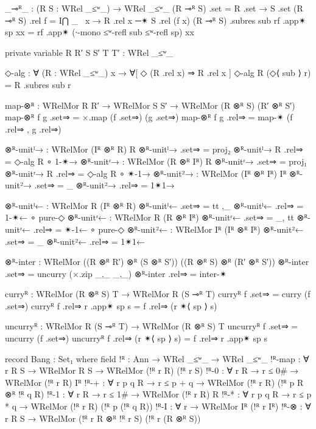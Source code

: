 \begin{code}
      _⊸ᴿ_ : (R S : WRel _≤ʷ_) → WRel _≤ʷ_
      (R ⊸ᴿ S) .set = R .set → S .set
      (R ⊸ᴿ S) .rel f = I⋂ _ \ x → R .rel x ─✴ S .rel (f x)
      (R ⊸ᴿ S) .subres sub rf .app✴ sp xx =
        rf .app✴ (∙-mono ≤ʷ-refl sub ≤ʷ-refl sp) xx

      private
        variable
          R R′ S S′ T T′ : WRel _≤ʷ_

      ◇-alg : ∀ (R : WRel _≤ʷ_) {x} → ∀[ ◇ (R .rel x) ⇒ R .rel x ]
      ◇-alg R (◇⟨ sub ⟩ r) = R .subres sub r

      map-⊗ᴿ : WRelMor R R′ → WRelMor S S′ → WRelMor (R ⊗ᴿ S) (R′ ⊗ᴿ S′)
      map-⊗ᴿ f g .set⇒ = ×.map (f .set⇒) (g .set⇒)
      map-⊗ᴿ f g .rel⇒ = map-✴ (f .rel⇒ , g .rel⇒)

      ⊗ᴿ-unitˡ→ : WRelMor (Iᴿ ⊗ᴿ R) R
      ⊗ᴿ-unitˡ→ .set⇒ = proj₂
      ⊗ᴿ-unitˡ→ {R} .rel⇒ = ◇-alg R ∘ 1-✴→
      ⊗ᴿ-unitʳ→ : WRelMor (R ⊗ᴿ Iᴿ) R
      ⊗ᴿ-unitʳ→ .set⇒ = proj₁
      ⊗ᴿ-unitʳ→ {R} .rel⇒ = ◇-alg R ∘ ✴-1→
      ⊗ᴿ-unit²→ : WRelMor (Iᴿ ⊗ᴿ Iᴿ) Iᴿ
      ⊗ᴿ-unit²→ .set⇒ = _
      ⊗ᴿ-unit²→ .rel⇒ = 1✴1→

      ⊗ᴿ-unitˡ← : WRelMor R (Iᴿ ⊗ᴿ R)
      ⊗ᴿ-unitˡ← .set⇒ = tt ,_
      ⊗ᴿ-unitˡ← .rel⇒ = 1-✴← ∘ pure-◇
      ⊗ᴿ-unitʳ← : WRelMor R (R ⊗ᴿ Iᴿ)
      ⊗ᴿ-unitʳ← .set⇒ = _, tt
      ⊗ᴿ-unitʳ← .rel⇒ = ✴-1← ∘ pure-◇
      ⊗ᴿ-unit²← : WRelMor Iᴿ (Iᴿ ⊗ᴿ Iᴿ)
      ⊗ᴿ-unit²← .set⇒ = _
      ⊗ᴿ-unit²← .rel⇒ = 1✴1←

      ⊗ᴿ-inter : WRelMor ((R ⊗ᴿ R′) ⊗ᴿ (S ⊗ᴿ S′)) ((R ⊗ᴿ S) ⊗ᴿ (R′ ⊗ᴿ S′))
      ⊗ᴿ-inter .set⇒ = uncurry (×.zip _,_ _,_)
      ⊗ᴿ-inter .rel⇒ = inter-✴

      curryᴿ : WRelMor (R ⊗ᴿ S) T → WRelMor R (S ⊸ᴿ T)
      curryᴿ f .set⇒ = curry (f .set⇒)
      curryᴿ f .rel⇒ r .app✴ sp s = f .rel⇒ (r ✴⟨ sp ⟩ s)

      uncurryᴿ : WRelMor R (S ⊸ᴿ T) → WRelMor (R ⊗ᴿ S) T
      uncurryᴿ f .set⇒ = uncurry (f .set⇒)
      uncurryᴿ f .rel⇒ (r ✴⟨ sp ⟩ s) = f .rel⇒ r .app✴ sp s

      record Bang : Set₁ where
        field
          !ᴿ : Ann → WRel _≤ʷ_ → WRel _≤ʷ_
          !ᴿ-map : ∀ {r R S} → WRelMor R S → WRelMor (!ᴿ r R) (!ᴿ r S)
          !ᴿ-0 : ∀ {r R} → r ≤ 0# → WRelMor (!ᴿ r R) Iᴿ
          !ᴿ-+ : ∀ {r p q R} → r ≤ p + q → WRelMor (!ᴿ r R) (!ᴿ p R ⊗ᴿ !ᴿ q R)
          !ᴿ-1 : ∀ {r R} → r ≤ 1# → WRelMor (!ᴿ r R) R
          !ᴿ-* : ∀ {r p q R} → r ≤ p * q → WRelMor (!ᴿ r R) (!ᴿ p (!ᴿ q R))
          !ᴿ-I : ∀ {r} → WRelMor Iᴿ (!ᴿ r Iᴿ)
          !ᴿ-⊗ : ∀ {r R S} → WRelMor (!ᴿ r R ⊗ᴿ !ᴿ r S) (!ᴿ r (R ⊗ᴿ S))


\end{code}

